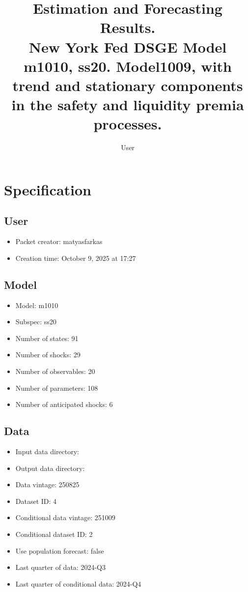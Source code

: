 \documentclass{article}
\title{Estimation and Forecasting Results. \\ New York Fed DSGE Model m1010, ss20. Model1009, with trend and stationary components in the safety and liquidity premia processes.}
\author{User}
\begin{document}
\maketitle


\section{Specification}

\subsection{User}

\begin{itemize}
  \item Packet creator: matyasfarkas
  \item Creation time: October 9, 2025 at 17:27
\end{itemize}

\subsection{Model}

\begin{itemize}
  \item Model: m1010
  \item Subspec: ss20
  \item Number of states: 91
  \item Number of shocks: 29
  \item Number of observables: 20
  \item Number of parameters: 108
  \item Number of anticipated shocks: 6
\end{itemize}

\subsection{Data}

\begin{itemize}
  \item Input data directory: 
  \item Output data directory: 
  \item Data vintage: 250825
  \item Dataset ID: 4
  \item Conditional data vintage: 251009
  \item Conditional dataset ID: 2
  \item Use population forecast: false
  \item Last quarter of data: 2024-Q3
  \item Last quarter of conditional data: 2024-Q4
\end{itemize}
\end{document}
